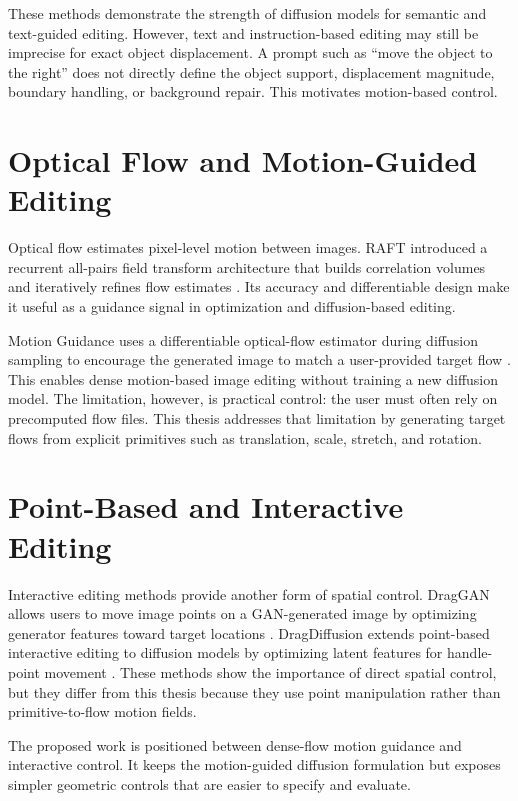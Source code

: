 These methods demonstrate the strength of diffusion models for semantic and text-guided editing. However, text and instruction-based editing may still be imprecise for exact object displacement. A prompt such as ``move the object to the right'' does not directly define the object support, displacement magnitude, boundary handling, or background repair. This motivates motion-based control.

\section{Optical Flow and Motion-Guided Editing}

Optical flow estimates pixel-level motion between images. RAFT introduced a recurrent all-pairs field transform architecture that builds correlation volumes and iteratively refines flow estimates \cite{teed2020raft}. Its accuracy and differentiable design make it useful as a guidance signal in optimization and diffusion-based editing.

Motion Guidance uses a differentiable optical-flow estimator during diffusion sampling to encourage the generated image to match a user-provided target flow \cite{geng2024motionguidance}. This enables dense motion-based image editing without training a new diffusion model. The limitation, however, is practical control: the user must often rely on precomputed flow files. This thesis addresses that limitation by generating target flows from explicit primitives such as translation, scale, stretch, and rotation.

\section{Point-Based and Interactive Editing}

Interactive editing methods provide another form of spatial control. DragGAN allows users to move image points on a GAN-generated image by optimizing generator features toward target locations \cite{pan2023draggan}. DragDiffusion extends point-based interactive editing to diffusion models by optimizing latent features for handle-point movement \cite{shi2023dragdiffusion}. These methods show the importance of direct spatial control, but they differ from this thesis because they use point manipulation rather than primitive-to-flow motion fields.

The proposed work is positioned between dense-flow motion guidance and interactive control. It keeps the motion-guided diffusion formulation but exposes simpler geometric controls that are easier to specify and evaluate.

